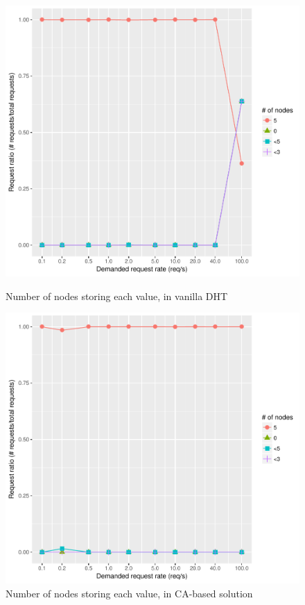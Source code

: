 \begin{figure}[H]
  \centering
  \begin{minipage}[t]{.45\textwidth}
    \centering
    \includegraphics[width=.8\textwidth,scale=0.4]{Figures/evaluation/stored-ratio-http.pdf}
    \caption{Number of nodes storing each value, in vanilla DHT}
\label{fig:stored-ratio-http}
  \end{minipage}\hfill
  \begin{minipage}[t]{.45\textwidth}
    \centering
    \includegraphics[width=.8\textwidth,scale=0.4]{Figures/evaluation/stored-ratio-https.pdf}
    \caption{Number of nodes storing each value, in CA-based solution}
\label{fig:stored-ratio-https}
  \end{minipage}
\end{figure}

